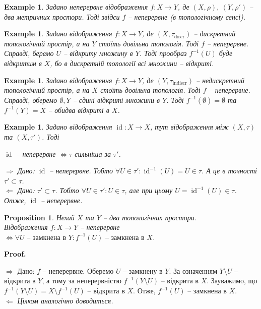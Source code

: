 \documentclass[a4paper, 10pt]{article}
\makeatletter
\def\rightproof{$\boxed{\Rightarrow}$ }
\def\leftproof{$\boxed{\Leftarrow}$ }
\theoremstyle{theoremdd}
\newtheorem{example}[theorem]{Example}
\newtheorem{proposition}[theorem]{Proposition}
\DeclareMathOperator{\id}{id}
\renewenvironment{proof}[1][Proof.\\]{\par
\pushQED{\hfill \qed}%
\normalfont \topsep6\p@\@plus6\p@\relax
\trivlist
\item\relax
{\bfseries
#1\@addpunct{.}}\hspace\labelsep\ignorespaces
}{%
\popQED\endtrivlist\@endpefalse
}
\makeatother
\begin{document}
\begin{example}
Задано неперервне відображення $f \colon X \to Y$, де $(X,\rho),\ (Y,\rho')$ -- два метричних простори. Тоді звідси $f$ -- неперервне (в топологічному сенсі).
\end{example}

\begin{example}
Задано відображення $f \colon X \to Y$, де $(X,\tau_{\text{discr}})$ -- дискретний топологічний простір, а на $Y$ стоїть довільна топологія. Тоді $f$ -- неперервне.
\bigskip \\
Справді, беремо $U$ -- відкриту множину в $Y$. Тоді прообраз $f^{-1}(U)$ буде відкритим в $X$, бо в дискретній топології всі множини -- відкриті.
\end{example}

\begin{example}
Задано відображення $f \colon X \to Y$, де $(Y,\tau_{\text{indiscr}})$ -- недискретний топологічний простір, а на $X$ стоїть довільна топологія. Тоді $f$ -- неперервне.
\bigskip \\
Справді, оберемо $\emptyset,Y$ -- єдині відкриті множини в $Y$. Тоді $f^{-1}(\emptyset) = \emptyset$ та $f^{-1}(Y) = X$ -- обидва відкриті в $X$.
\end{example}

\begin{example}
\label{identity_and_topology_comparison}
Задано відображення $\id \colon X \to X$, тут відображення між $(X,\tau)$ та $(X,\tau')$. Тоді
\begin{center}
$\id$ -- неперервне $\iff \tau$ сильніша за $\tau'$.
\end{center}
\rightproof Дано: $\id$ -- неперервне. Тобто $\forall U \in \tau': \id^{-1}(U) = U \in \tau$. А це в точності $\tau' \subset \tau$.\\
\leftproof Дано: $\tau' \subset \tau$. Тобто $\forall U \in \tau': U \in \tau$, але при цьому $U = \id^{-1}(U) \in \tau$. Отже, $\id$ -- неперервне.
\end{example}

\begin{proposition}
Нехай $X$ та $Y$ -- два топологічних простори.\\
Відображення $f \colon X \to Y$ -- неперервне $\iff \forall U \text{ -- замкнена в } Y: f^{-1}(U) \text{ -- замкнена в } X$.
\end{proposition}

\begin{proof}
\rightproof Дано: $f$ -- неперервне. Оберемо $U$ -- замкнену в $Y$. За означенням $Y \setminus U$ -- відкрита в $Y$, а тому за неперервністю $f^{-1}(Y \setminus U)$ -- відкрита в $X$. Зауважимо, що $f^{-1}(Y \setminus U) = X \setminus f^{-1}(U)$ -- відкрита в $X$. Отже, $f^{-1}(U)$ -- замкнена в $X$.
\bigskip \\
\leftproof \textit{Цілком аналогічно доводиться.}
\end{proof}
\end{document}
